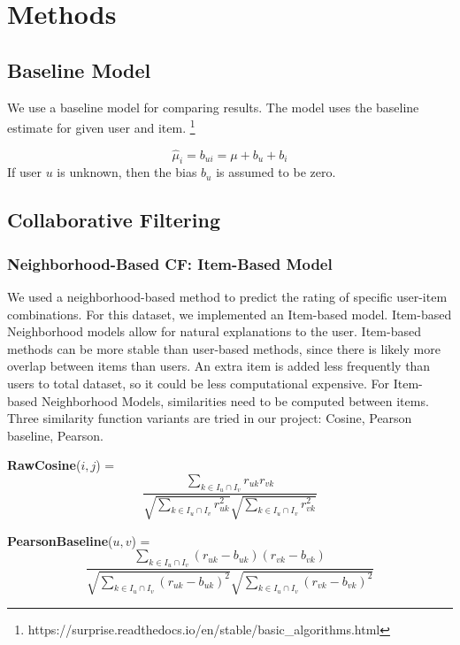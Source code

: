 \documentclass[12pt,journal,compsoc]{IEEEtran}
\begin{document}
\section{Methods}

\subsection{Baseline Model}
We use a baseline model for comparing results. The model uses the baseline estimate for given user and item. \footnote{https://surprise.readthedocs.io/en/stable/basic\_algorithms.html}

$$\hat \mu_i = b_{ui} = \mu + b_u + b_i$$
If user $u$ is unknown, then the bias $b_u$ is assumed to be zero. 


\subsection{Collaborative Filtering}

\subsubsection{Neighborhood-Based CF: Item-Based Model}

We used a neighborhood-based method to predict the rating of specific user-item combinations. For this dataset, we implemented an Item-based model. Item-based Neighborhood models allow for natural explanations to the user. Item-based methods can be more stable than user-based methods, since there is likely more overlap between items than users. An extra item is added less frequently than users to total dataset, so it could be less computational expensive.
For Item-based Neighborhood Models, similarities need to be computed between items. Three similarity function variants are tried in our project: Cosine, Pearson baseline, Pearson. 

{\bf RawCosine}($i, j$) = $$\frac{\sum_{k \in I_u \cap I_v} r_{uk} r_{vk}}{\sqrt{\sum_{k \in I_u \cap I_v}r_{uk}^2} \sqrt{\sum_{k \in I_u \cap I_v}r_{vk}^2}}$$

{\bf PearsonBaseline}($u, v$) = $$\frac{\sum_{k \in I_u \cap I_v} (r_{uk} - b_{uk})(r_{vk}-b_{vk})}{\sqrt{\sum_{k \in I_u \cap I_v}(r_{uk} - b_{uk})^2} \sqrt{\sum_{k \in I_u \cap I_v}(r_{vk} - b_{vk})^2}}$$
\end{document}
